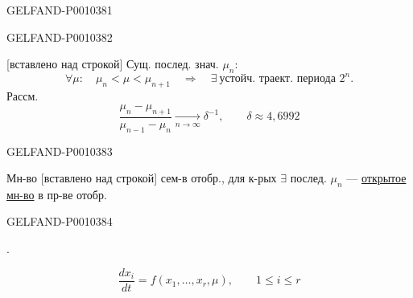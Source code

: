 \begin{GelfandAdjacentEvidence}{GELFAND-P001038}{1}
\end{GelfandAdjacentEvidence}
\begin{GelfandAdjacentEvidence}{GELFAND-P001038}{2}

[вставлено над строкой] Сущ. послед. знач. $\mu_n$:
\begin{equation*}
\forall\mu:\quad \mu_n<\mu<\mu_{n+1}\quad\Rightarrow\quad
\exists\ \text{устойч. траект. периода }2^n.
\tag{1}
\end{equation*}
Рассм.
\begin{equation*}
\frac{\mu_n-\mu_{n+1}}{\mu_{n-1}-\mu_n}
\underset{n\to\infty}{\longrightarrow}\delta^{-1},\qquad
\delta\approx4{,}6992
\tag{2}
\end{equation*}
\end{GelfandAdjacentEvidence}
\begin{GelfandAdjacentEvidence}{GELFAND-P001038}{3}


Мн-во [вставлено над строкой] сем-в отобр., для к-рых $\exists$ послед. $\mu_n$ ---
\underline{открытое мн-во} в пр-ве отобр.
\end{GelfandAdjacentEvidence}
\begin{GelfandAdjacentEvidence}{GELFAND-P001038}{4}


.

\begin{equation*}
\frac{dx_i}{dt}=f(x_1,\ldots,x_r,\mu),\qquad1\le i\le r
\tag{3}
\end{equation*}
\end{GelfandAdjacentEvidence}
